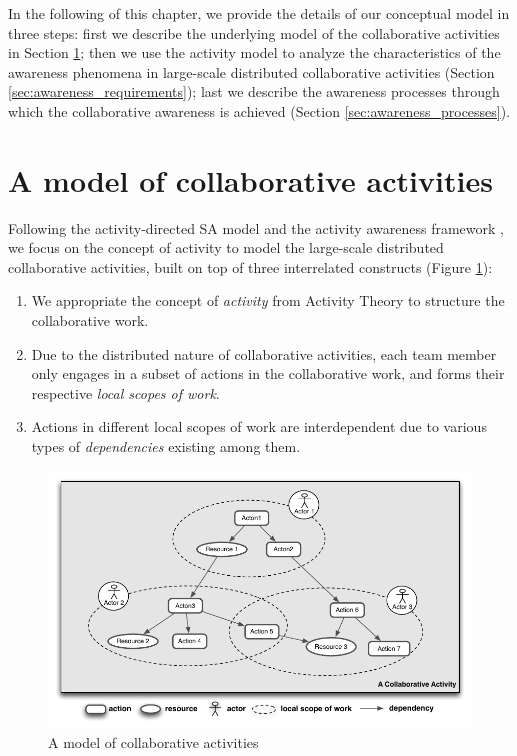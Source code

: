 In the following of this chapter, we provide the details of our conceptual model in three steps: first we describe the underlying model of the collaborative activities in Section \ref{sec:a_model_of_collaborative_activities}; then we use the activity model to analyze the characteristics of the awareness phenomena in large-scale distributed collaborative activities (Section \ref{sec:awareness_requirements}); last we describe the awareness processes through which the collaborative awareness is achieved (Section \ref{sec:awareness_processes}).

\section{A model of collaborative activities} %
\label{sec:a_model_of_collaborative_activities}
Following the activity-directed SA model \cite{Bedny1999} and the activity awareness framework \cite{carroll2003a}, we focus on the concept of activity to model the large-scale distributed collaborative activities, built on top of three interrelated constructs (Figure \ref{fig:model_of_collaborative_activity}):

\begin{enumerate}
	\item We appropriate the concept of \emph{activity} from Activity Theory \cite{nardi1996context} to structure the collaborative work.
	\item Due to the distributed nature of collaborative activities, each team member only engages in a subset of actions in the collaborative work, and forms their respective \emph{local scopes of work}.
	\item Actions in different local scopes of work are interdependent due to various types of \emph{dependencies} existing among them.
\end{enumerate}

\begin{figure}[htbp] %
   \centering
   \includegraphics{model_of_collaborative_activity.pdf} 
   \caption{A model of collaborative activities}
   \label{fig:model_of_collaborative_activity}
\end{figure}

